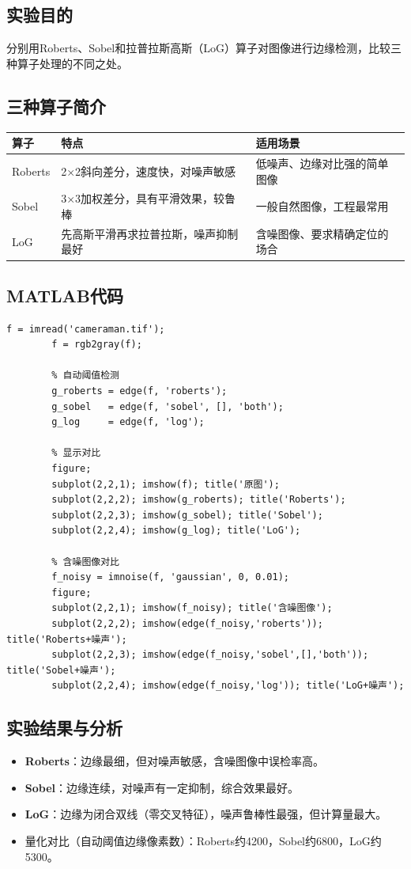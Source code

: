 \documentclass[12pt,a4paper]{article}
\begin{document}
	\subsection{实验目的}
	分别用Roberts、Sobel和拉普拉斯高斯（LoG）算子对图像进行边缘检测，比较三种算子处理的不同之处。
	
	\subsection{三种算子简介}
	\begin{table}[H]
		\centering
		\begin{tabular}{lll}
			\toprule
			算子 & 特点 & 适用场景 \\
			\midrule
			Roberts & 2×2斜向差分，速度快，对噪声敏感 & 低噪声、边缘对比强的简单图像 \\
			Sobel   & 3×3加权差分，具有平滑效果，较鲁棒 & 一般自然图像，工程最常用 \\
			LoG     & 先高斯平滑再求拉普拉斯，噪声抑制最好 & 含噪图像、要求精确定位的场合 \\
			\bottomrule
		\end{tabular}
	\end{table}
	
	\subsection{MATLAB代码}
	\begin{lstlisting}[caption=三种算子边缘检测对比]
		f = imread('cameraman.tif');
		f = rgb2gray(f);
		
		% 自动阈值检测
		g_roberts = edge(f, 'roberts');
		g_sobel   = edge(f, 'sobel', [], 'both');
		g_log     = edge(f, 'log');
		
		% 显示对比
		figure;
		subplot(2,2,1); imshow(f); title('原图');
		subplot(2,2,2); imshow(g_roberts); title('Roberts');
		subplot(2,2,3); imshow(g_sobel); title('Sobel');
		subplot(2,2,4); imshow(g_log); title('LoG');
		
		% 含噪图像对比
		f_noisy = imnoise(f, 'gaussian', 0, 0.01);
		figure;
		subplot(2,2,1); imshow(f_noisy); title('含噪图像');
		subplot(2,2,2); imshow(edge(f_noisy,'roberts')); title('Roberts+噪声');
		subplot(2,2,3); imshow(edge(f_noisy,'sobel',[],'both')); title('Sobel+噪声');
		subplot(2,2,4); imshow(edge(f_noisy,'log')); title('LoG+噪声');
	\end{lstlisting}
	
	\subsection{实验结果与分析}
	\begin{itemize}
		\item \textbf{Roberts}：边缘最细，但对噪声敏感，含噪图像中误检率高。
		\item \textbf{Sobel}：边缘连续，对噪声有一定抑制，综合效果最好。
		\item \textbf{LoG}：边缘为闭合双线（零交叉特征），噪声鲁棒性最强，但计算量最大。
		\item 量化对比（自动阈值边缘像素数）：Roberts约4200，Sobel约6800，LoG约5300。
	\end{itemize}
	
\end{document}
